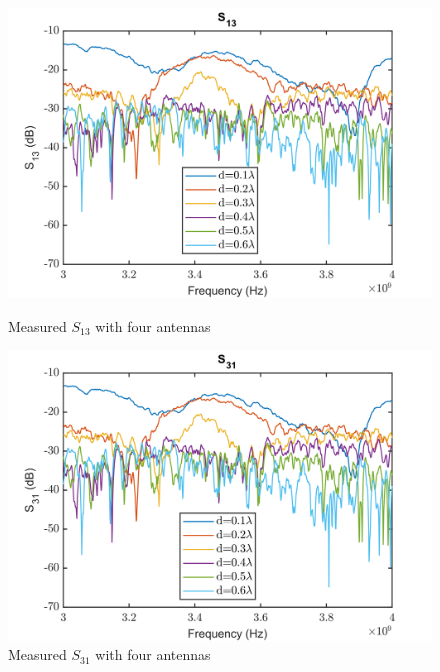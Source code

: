 \begin{figure}[H]
  \centering
  \begin{minipage}[b]{0.5\textwidth}
	\includegraphics[scale = 0.5]{figures/measurement/antennas/spar_four_ant_s13.png}
	\caption{Measured $S_{13}$ with four antennas}
    \label{fig:chamber_four_ant_s13}
  \end{minipage}
  \hfill
  \begin{minipage}[b]{0.4\textwidth}
\includegraphics[scale = 0.5]{figures/measurement/antennas/spar_four_ant_s31.png}
\caption{Measured $S_{31}$ with four antennas}
    \label{fig:chamber_four_ant_s31}
  \end{minipage}
\end{figure}


